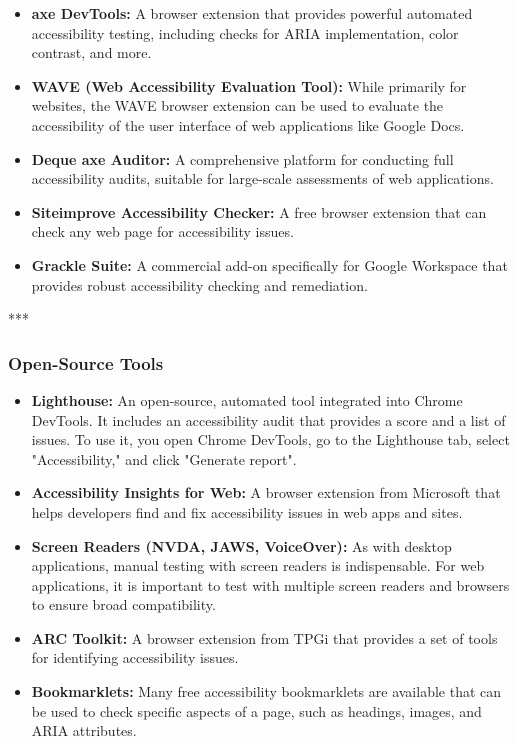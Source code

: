 \begin{itemize}
	\item \textbf{axe DevTools\supercite{AxeDevTools}:} A browser extension that provides powerful automated accessibility testing, including checks for \gls{ARIA} implementation, color contrast, and more.
	\item \textbf{WAVE (Web Accessibility Evaluation Tool)\supercite{WAVE}:} While primarily for websites, the WAVE browser extension can be used to evaluate the accessibility of the user interface of web applications like Google Docs.
	\item \textbf{Deque axe Auditor\supercite{DequeWorldSpace}:} A comprehensive platform for conducting full accessibility audits, suitable for large-scale assessments of web applications.
	\item \textbf{Siteimprove Accessibility Checker\supercite{SiteimproveAccessibility}:} A free browser extension that can check any web page for accessibility issues.
	\item \textbf{Grackle Suite\supercite{GrackleDocs}:} A commercial add-on specifically for Google Workspace that provides robust accessibility checking and remediation.
\end{itemize}

***

\subsubsection{Open-Source Tools}
\label{sub:open-source-tools-1}

\begin{itemize}
	\item \textbf{Lighthouse\supercite{Lighthouse}:} An open-source, automated tool integrated into Chrome DevTools. It includes an accessibility audit that provides a score and a list of issues. To use it, you open Chrome DevTools, go to the Lighthouse tab, select "Accessibility," and click "Generate report".
	\item \textbf{Accessibility Insights for Web\supercite{AccessibilityInsights}:} A browser extension from Microsoft that helps developers find and fix accessibility issues in web apps and sites.
	\item \textbf{Screen Readers (NVDA, JAWS, VoiceOver):} As with desktop applications, manual testing with screen readers is indispensable. For web applications, it is important to test with multiple screen readers and browsers to ensure broad compatibility.
	\item \textbf{ARC Toolkit\supercite{ARCToolkit}:} A browser extension from TPGi that provides a set of tools for identifying accessibility issues.
	\item \textbf{Bookmarklets\supercite{A11yProject}:} Many free accessibility bookmarklets are available that can be used to check specific aspects of a page, such as headings, images, and \gls{ARIA} attributes.
\end{itemize}


